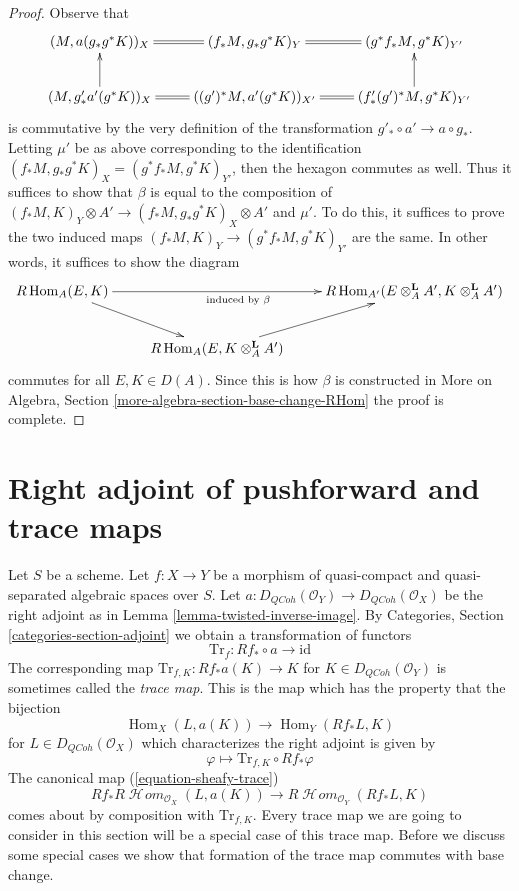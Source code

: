 \documentclass{stacks-project}
\theoremstyle{plain}
\theoremstyle{definition}
\theoremstyle{remark}
\numberwithin{equation}{subsection}
\def\Hom{\mathop{\mathrm{Hom}}\nolimits}
\def\SheafHom{\mathop{\mathcal{H}\!\mathit{om}}\nolimits}
\def\QCoh{\mathit{QCoh}}
\begin{document}
\begin{proof}
\medskip\noindent
Observe that
$$
\xymatrix{
(M, a(g_*g^*K))_X &
(f_*M, g_* g^*K)_Y \ar@{=}[l] &
(g^*f_*M, g^*K)_{Y'} \ar@{=}[l] \\
(M, g'_* a'(g^*K))_X \ar[u] &
((g')^*M, a'(g^*K))_{X'} \ar@{=}[l] &
(f'_*(g')^*M, g^*K)_{Y'} \ar@{=}[l] \ar[u]
}
$$
is commutative by the very definition of the transformation
$g'_* \circ a' \to a \circ g_*$. Letting $\mu'$ be as above
corresponding to the identification
$(f_*M, g_*g^*K)_X = (g^*f_*M, g^*K)_{Y'}$, then the
hexagon commutes as well. Thus it suffices to show that
$\beta$ is equal to the composition of
$(f_*M, K)_Y \otimes A' \to (f_*M, g_*g^*K)_X \otimes A'$
and $\mu'$. To do this, it suffices to prove the two induced maps
$(f_*M, K)_Y \to (g^*f_*M, g^*K)_{Y'}$ are the same.
In other words, it suffices to show the diagram
$$
\xymatrix{
R\Hom_A(E, K) \ar[rr]_{\text{induced by }\beta} \ar[rd] & &
R\Hom_{A'}(E \otimes_A^\mathbf{L} A', K \otimes_A^\mathbf{L} A') \\
& R\Hom_A(E, K \otimes_A^\mathbf{L} A') \ar[ru]
}
$$
commutes for all $E, K \in D(A)$. Since this is how $\beta$ is constructed in
More on Algebra, Section \ref{more-algebra-section-base-change-RHom}
the proof is complete.
\end{proof}









\section{Right adjoint of pushforward and trace maps}
\label{section-trace}

\noindent
Let $S$ be a scheme.
Let $f : X \to Y$ be a morphism of quasi-compact and quasi-separated
algebraic spaces over $S$.
Let $a : D_\QCoh(\mathcal{O}_Y) \to D_\QCoh(\mathcal{O}_X)$
be the right adjoint as in Lemma \ref{lemma-twisted-inverse-image}. By
Categories, Section \ref{categories-section-adjoint} we obtain a
transformation of functors
$$
\text{Tr}_f : Rf_* \circ a \longrightarrow \text{id}
$$
The corresponding map $\text{Tr}_{f, K} : Rf_*a(K) \longrightarrow K$
for $K \in D_\QCoh(\mathcal{O}_Y)$ is sometimes called the {\it trace map}.
This is the map which has the property that the bijection
$$
\Hom_X(L, a(K)) \longrightarrow \Hom_Y(Rf_*L, K)
$$
for $L \in D_\QCoh(\mathcal{O}_X)$ which characterizes the right adjoint
is given by
$$
\varphi \longmapsto \text{Tr}_{f, K} \circ Rf_*\varphi
$$
The canonical map (\ref{equation-sheafy-trace})
$$
Rf_*R\SheafHom_{\mathcal{O}_X}(L, a(K))
\longrightarrow
R\SheafHom_{\mathcal{O}_Y}(Rf_*L, K)
$$
comes about by composition with $\text{Tr}_{f, K}$.
Every trace map we are going to consider in this section will be a
special case of this trace map. Before we discuss some special cases
we show that formation of the trace map commutes with base change.
\end{document}
